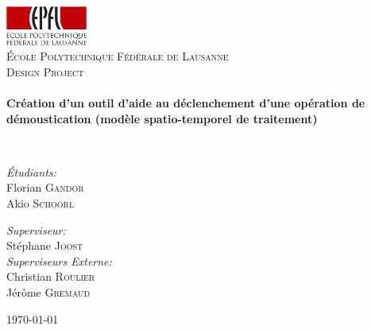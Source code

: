 \begin{titlepage}
\begin{center}

\includegraphics[width=0.20\textwidth]{EPFL_LOG_RVB-55.png}~\\[1cm]

\textsc{\LARGE École Polytechnique Fédérale de Lausanne}\\[1.5cm]

\textsc{\Large Design Project}\\[0.5cm]

\HRule \\[0.4cm]
{ \huge \bfseries Création d'un outil d'aide au déclenchement d'une opération de démoustication (modèle spatio-temporel de traitement) \\[0.4cm] }

\HRule \\[1.5cm]

\begin{minipage}{0.4\textwidth}
\begin{flushleft} \large
\emph{Étudiants:}\\
Florian \textsc{Gandor}\\
Akio \textsc{Schoorl}
\end{flushleft}
\end{minipage}
\begin{minipage}{0.4\textwidth}
\begin{flushright} \large
\emph{Superviseur:} \\
Stéphane \textsc{Joost}\\
\emph{Superviseurs Externe:} \\
Christian \textsc{Roulier}\\
Jérôme \textsc{Gremaud}
\end{flushright}
\end{minipage}


\vfill

{\large \today}

\end{center}
\end{titlepage}